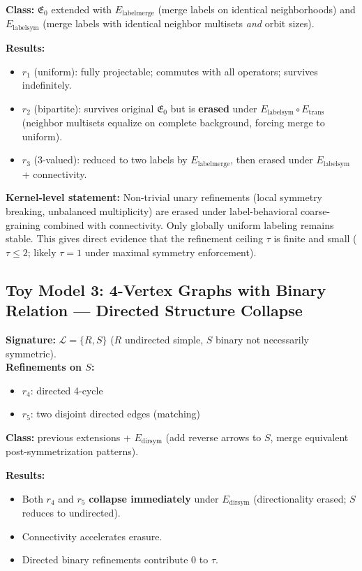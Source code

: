 \documentclass[11pt,a4paper]{article}
\theoremstyle{definition}
\theoremstyle{remark}
\begin{document}
\textbf{Class:} $\mathfrak{E}_0$ extended with $E_{\mathrm{labelmerge}}$ (merge labels on identical neighborhoods) and $E_{\mathrm{labelsym}}$ (merge labels with identical neighbor multisets \emph{and} orbit sizes).

\textbf{Results:}
\begin{itemize}[nosep]
  \item $r_1$ (uniform): fully projectable; commutes with all operators; survives indefinitely.
  \item $r_2$ (bipartite): survives original $\mathfrak{E}_0$ but is \textbf{erased} under $E_{\mathrm{labelsym}} \circ E_{\mathrm{trans}}$ (neighbor multisets equalize on complete background, forcing merge to uniform).
  \item $r_3$ (3-valued): reduced to two labels by $E_{\mathrm{labelmerge}}$, then erased under $E_{\mathrm{labelsym}}$ + connectivity.
\end{itemize}

\textbf{Kernel-level statement:} Non-trivial unary refinements (local symmetry breaking, unbalanced multiplicity) are erased under label-behavioral coarse-graining combined with connectivity. Only globally uniform labeling remains stable. This gives direct evidence that the refinement ceiling $\tau$ is finite and small ($\tau \leq 2$; likely $\tau=1$ under maximal symmetry enforcement).

\subsection{Toy Model 3: 4-Vertex Graphs with Binary Relation --- Directed Structure Collapse}

\textbf{Signature:} $\mathcal{L}=\{R,S\}$ ($R$ undirected simple, $S$ binary not necessarily symmetric).\\
\textbf{Refinements on $S$:}
\begin{itemize}[nosep]
  \item $r_4$: directed 4-cycle
  \item $r_5$: two disjoint directed edges (matching)
\end{itemize}

\textbf{Class:} previous extensions + $E_{\mathrm{dirsym}}$ (add reverse arrows to $S$, merge equivalent post-symmetrization patterns).

\textbf{Results:}
\begin{itemize}[nosep]
  \item Both $r_4$ and $r_5$ \textbf{collapse immediately} under $E_{\mathrm{dirsym}}$ (directionality erased; $S$ reduces to undirected).
  \item Connectivity accelerates erasure.
  \item Directed binary refinements contribute 0 to $\tau$.
\end{itemize}
\end{document}
